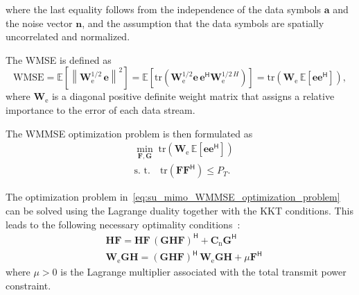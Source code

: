 where the last equality follows from the independence of the data symbols $\mathbf{a}$ and the noise vector $\mathbf{n}$, and the assumption that the data symbols are spatially uncorrelated and normalized.

The \ac{WMSE} is defined as
\begin{equation}
\label{eq:wmse_matrix}
    \text{WMSE} 
    = \mathbb{E}\!\left[ \left\|\mathbf{W}^{1/2}_{\mathrm{e}} \, \mathbf{e}\right\|^2 \right]
    = \mathbb{E}\!\left[ \mathrm{tr}(\mathbf{W}^{1/2}_{\mathrm{e}} \mathbf{e} \, \mathbf{e}^{\mathsf{H}} \mathbf{W}^{1/2 \, H}_{\mathrm{e}}) \right]
    = \mathrm{tr}(\mathbf{W}_{\mathrm{e}} \, \mathbb{E}\!\left[\mathbf{e} \mathbf{e}^{\mathsf{H}} \right]),
\end{equation}
where $\mathbf{W}_{\mathrm{e}}$ is a diagonal positive definite weight matrix that assigns a relative importance to the error of each data stream.

The \ac{WMMSE} optimization problem is then formulated as
\begin{equation}
\label{eq:su_mimo_WMMSE_optimization_problem}
\begin{aligned}
    & \min_{\mathbf{F}, \mathbf{G}} \; \mathrm{tr}(\mathbf{W}_{\mathrm{e}} \, \mathbb{E}\!\left[\mathbf{e} \mathbf{e}^{\mathsf{H}} \right]) \\
    & \text{s. t.} \quad \mathrm{tr}(\mathbf{F}\mathbf{F}^{\mathsf{H}}) \leq P_T.
\end{aligned}
\end{equation}

The optimization problem in~\eqref{eq:su_mimo_WMMSE_optimization_problem} can be solved using the Lagrange duality together with the \acf{KKT} conditions.
This leads to the following necessary optimality conditions~\cite{su_mimo_joint_precoder_decoder_design}:
\begin{subequations}
\begin{align}
    & \mathbf{H}\mathbf{F} = \mathbf{H}\mathbf{F} \, (\mathbf{G}\mathbf{H}\mathbf{F})^{\mathsf{H}} + \mathbf{C}_{\mathrm{n}}\mathbf{G}^{\mathsf{H}} \\
    & \mathbf{W}_{\mathrm{e}} \mathbf{G}\mathbf{H} = (\mathbf{G}\mathbf{H}\mathbf{F})^{\mathsf{H}} \, \mathbf{W}_{\mathrm{e}} \mathbf{G}\mathbf{H} + \mu \mathbf{F}^{\mathsf{H}}
\end{align}
\end{subequations}
where $\mu > 0$ is the Lagrange multiplier associated with the total transmit power constraint.

